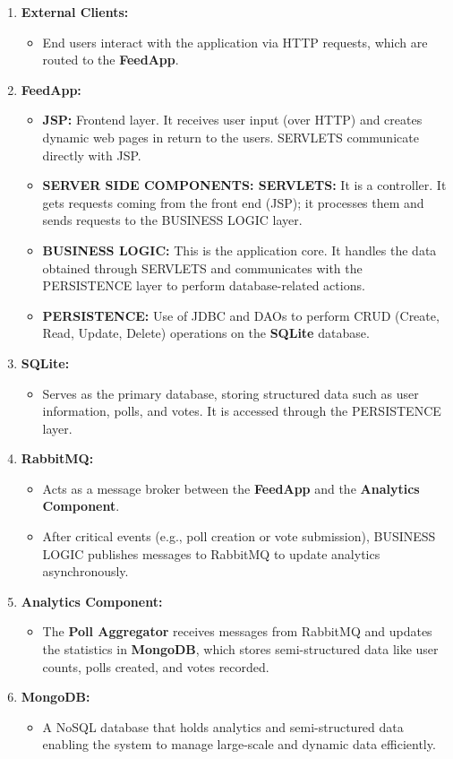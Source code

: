 \begin{enumerate}
    \item \textbf{External Clients:}
    \begin{itemize}
        \item End users interact with the application via HTTP requests, which are routed to the \textbf{FeedApp}.
    \end{itemize}

    \item \textbf{FeedApp:}
    \begin{itemize}
        \item \textbf{JSP:} Frontend layer. It receives user input (over HTTP) and creates dynamic web pages in return to the users. SERVLETS communicate directly with JSP.
        \item \textbf{SERVER SIDE COMPONENTS: SERVLETS:} It is a controller. It gets requests coming from the front end (JSP); it processes them and sends requests to the BUSINESS LOGIC layer.
        \item \textbf{BUSINESS LOGIC:} This is the application core. It handles the data obtained through SERVLETS and communicates with the PERSISTENCE layer to perform database-related actions.
        \item \textbf{PERSISTENCE:} Use of JDBC and DAOs to perform CRUD (Create, Read, Update, Delete) operations on the \textbf{SQLite} database.
    \end{itemize}

    \item \textbf{SQLite:}
    \begin{itemize}
        \item Serves as the primary database, storing structured data such as user information, polls, and votes. It is accessed through the PERSISTENCE layer.
    \end{itemize}

    \item \textbf{RabbitMQ:}
    \begin{itemize}
        \item Acts as a message broker between the \textbf{FeedApp} and the \textbf{Analytics Component}.
        \item After critical events (e.g., poll creation or vote submission), BUSINESS LOGIC publishes messages to RabbitMQ to update analytics asynchronously.
    \end{itemize}

    \item \textbf{Analytics Component:}
    \begin{itemize}
        \item The \textbf{Poll Aggregator} receives messages from RabbitMQ and updates the statistics in \textbf{MongoDB}, which stores semi-structured data like user counts, polls created, and votes recorded.
    \end{itemize}

    \item \textbf{MongoDB:}
    \begin{itemize}
        \item A NoSQL database that holds analytics and semi-structured data enabling the system to manage large-scale and dynamic data efficiently.
    \end{itemize}
\end{enumerate}